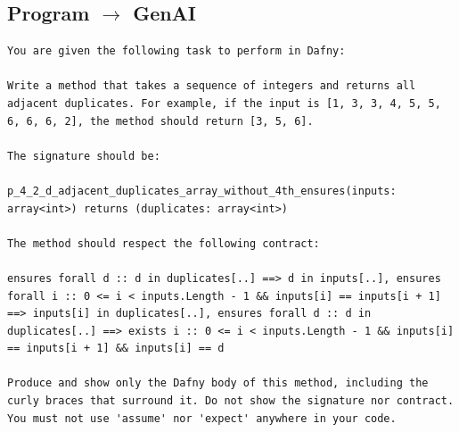 \documentclass{article}
\begin{document}
\subsection*{Program $\rightarrow$ GenAI}
\begin{lstlisting}
You are given the following task to perform in Dafny:

Write a method that takes a sequence of integers and returns all adjacent duplicates. For example, if the input is [1, 3, 3, 4, 5, 5, 6, 6, 6, 2], the method should return [3, 5, 6].

The signature should be:

p_4_2_d_adjacent_duplicates_array_without_4th_ensures(inputs: array<int>) returns (duplicates: array<int>)

The method should respect the following contract:

ensures forall d :: d in duplicates[..] ==> d in inputs[..], ensures forall i :: 0 <= i < inputs.Length - 1 && inputs[i] == inputs[i + 1] ==> inputs[i] in duplicates[..], ensures forall d :: d in duplicates[..] ==> exists i :: 0 <= i < inputs.Length - 1 && inputs[i] == inputs[i + 1] && inputs[i] == d

Produce and show only the Dafny body of this method, including the curly braces that surround it. Do not show the signature nor contract. You must not use 'assume' nor 'expect' anywhere in your code.
\end{lstlisting}
\end{document}

